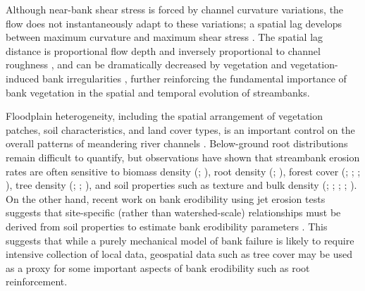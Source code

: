 \documentclass[preprint, review, authoryear, 12pt]{elsarticle}
\begin{document}
Although near-bank shear stress is forced by channel curvature variations, the flow does not instantaneously adapt to these variations; a spatial lag develops between maximum curvature and maximum shear stress \citep{Crosato2009}. The spatial lag distance is proportional flow depth and inversely proportional to channel roughness \citep{Blanckaert2010}, and can be dramatically decreased by vegetation and vegetation-induced bank irregularities \citep{Thorne1995}, further reinforcing the fundamental importance of bank vegetation in the spatial and temporal evolution of streambanks.
 
Floodplain heterogeneity, including the spatial arrangement of vegetation patches, soil characteristics, and land cover types, is an important control on the overall patterns of meandering river channels \citep{Guneralp2011}. Below-ground root distributions remain difficult to quantify, but observations have shown that streambank erosion rates are often sensitive to biomass density (\citealp{Micheli2002}; \citealp{Perucca2007}), root density (\citealp{Micheli2002}; \citealp{Wynn2006}), forest cover (\citealp{Stott1997}; \citealp{Micheli2004}; \citealp{Allmendinger2005}; \citealp{Hubble2010}), tree density (\citealp{Pizzuto1989}; \citealp{Sass2012}; \citealp{Konsoer2016}), and soil properties such as texture and bulk density (\citealp{Pizzuto1984}; \citealp{Couper2003}; \citealp{Julian2006}; \citealp{Wynn2006}; \citealp{Konsoer2016}). On the other hand, recent work on bank erodibility using jet erosion tests suggests that site-specific (rather than watershed-scale) relationships must be derived from soil properties to estimate bank erodibility parameters \citep{Daly2015}. This suggests that while a purely mechanical model of bank failure is likely to require intensive collection of local data, geospatial data such as tree cover may be used as a proxy for some important aspects of bank erodibility such as root reinforcement.
\end{document}
